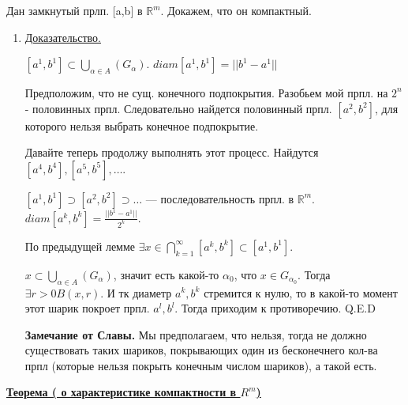 \documentclass{article}
\newcommand{\thmm}[1]{\underline{\textbf{#1}}}
\begin{document}
Дан замкнутый прлп. [a,b] в $\mathbb{R}^m$. Докажем, что он компактный.
\begin{enumerate}
        \item[] \uline{Доказательство.}


        $[a^1,b^1] \subset \bigcup\limits_{\alpha \in A} (G_\alpha) $. $diam[a^1,b^1]=||b^1-a^1||$
        
        Предположим, что не сущ. конечного подпокрытия. Разобьем мой прпл. на $2^n$ - половинных прпл. Следовательно найдется половинный прпл. $[a^2,b^2]$, для которого нельзя выбрать конечное подпокрытие.

        Давайте теперь продолжу выполнять этот процесс. Найдутся $[a^4,b^4],[a^5,b^5],\ldots$.

        $[a^1,b^1]\supset [a^2,b^2]\supset \ldots$ --- последовательность прпл. в $\mathbb{R}^m$. $diam[a^k,b^k]=\frac{||b^1-a^1||}{2^k}$.

        По предыдущей лемме $\exists x \in \bigcap\limits_{k=1}^{\infty} [a^k,b^k] \subset [a^1,b^1]$. 

           $x\subset \bigcup\limits_{\alpha \in A} (G_\alpha)$, значит есть какой-то $\alpha_0$, что $x\in G_{\alpha_0}$. Тогда $\exists r>0 B(x,r)$. И тк диаметр $a^k,b^k$ стремится к нулю, то в какой-то момент этот шарик покроет прпл. $a^l,b^l$. Тогда приходим к противоречию. Q.E.D

           \textbf{Замечание от Славы.} Мы предполагаем, что нельзя, тогда не должно существовать таких шариков, покрывающих один из бесконечнего кол-ва прпл (которые нельзя покрыть конечным числом шариков), а такой есть.
\end{enumerate}

\thmm{Теорема ( о характеристике компактности в $R^m$)}
\end{document}
